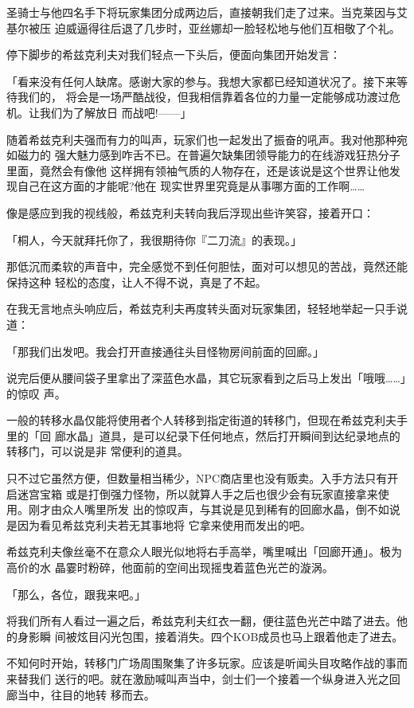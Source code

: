 \documentclass[11pt]{book}
\begin{document}
圣骑士与他四名手下将玩家集团分成两边后，直接朝我们走了过来。当克莱因与艾基尔被压
迫威逼得往后退了几步时，亚丝娜却一脸轻松地与他们互相敬了个礼。

停下脚步的希兹克利夫对我们轻点一下头后，便面向集团开始发言：

「看来没有任何人缺席。感谢大家的参与。我想大家都已经知道状况了。接下来等待我们的，
将会是一场严酷战役，但我相信靠着各位的力量一定能够成功渡过危机。让我们为了解放日
而战吧!——」

随着希兹克利夫强而有力的叫声，玩家们也一起发出了振奋的吼声。我对他那种宛如磁力的
强大魅力感到咋舌不已。在普遍欠缺集团领导能力的在线游戏狂热分子里面，竟然会有像他
这样拥有领袖气质的人物存在，还是该说是这个世界让他发现自己在这方面的才能呢?他在
现实世界里究竟是从事哪方面的工作啊……

像是感应到我的视线般，希兹克利夫转向我后浮现出些许笑容，接着开口：

「桐人，今天就拜托你了，我很期待你『二刀流』的表现。」

那低沉而柔软的声音中，完全感觉不到任何胆怯，面对可以想见的苦战，竟然还能保持这种
轻松的态度，让人不得不说，真是了不起。

在我无言地点头响应后，希兹克利夫再度转头面对玩家集团，轻轻地举起一只手说道：

「那我们出发吧。我会打开直接通往头目怪物房间前面的回廊。」

说完后便从腰间袋子里拿出了深蓝色水晶，其它玩家看到之后马上发出「哦哦……」的惊叹
声。

一般的转移水晶仅能将使用者个人转移到指定街道的转移门，但现在希兹克利夫手里的「回
廊水晶」道具，是可以纪录下任何地点，然后打开瞬间到达纪录地点的转移门，可以说是非
常便利的道具。

只不过它虽然方便，但数量相当稀少，NPC商店里也没有贩卖。入手方法只有开启迷宫宝箱
或是打倒强力怪物，所以就算人手之后也很少会有玩家直接拿来使用。刚才由众人嘴里所发
出的惊叹声，与其说是见到稀有的回廊水晶，倒不如说是因为看见希兹克利夫若无其事地将
它拿来使用而发出的吧。

希兹克利夫像丝毫不在意众人眼光似地将右手高举，嘴里喊出「回廊开通」。极为高价的水
晶霎时粉碎，他面前的空间出现摇曳着蓝色光芒的漩涡。

「那么，各位，跟我来吧。」

将我们所有人看过一遍之后，希兹克利夫红衣一翻，便往蓝色光芒中踏了进去。他的身影瞬
间被炫目闪光包围，接着消失。四个KOB成员也马上跟着他走了进去。

不知何时开始，转移门广场周围聚集了许多玩家。应该是听闻头目攻略作战的事而来替我们
送行的吧。就在激励喊叫声当中，剑士们一个接着一个纵身进入光之回廊当中，往目的地转
移而去。
\end{document}
